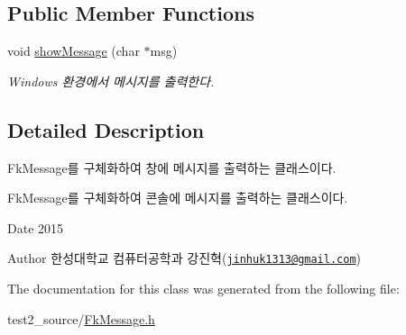 \subsection*{Public Member Functions}
\begin{DoxyCompactItemize}
\item 
\hypertarget{class_fk_windows_message_a13b6e901b6bfa83a09e9a099d40bf25c}{}void \hyperlink{class_fk_windows_message_a13b6e901b6bfa83a09e9a099d40bf25c}{show\+Message} (char $\ast$msg)\label{class_fk_windows_message_a13b6e901b6bfa83a09e9a099d40bf25c}

\begin{DoxyCompactList}\small\item\em Windows 환경에서 메시지를 출력한다. \end{DoxyCompactList}\end{DoxyCompactItemize}


\subsection{Detailed Description}
Fk\+Message를 구체화하여 창에 메시지를 출력하는 클래스이다. 

Fk\+Message를 구체화하여 콘솔에 메시지를 출력하는 클래스이다.

\begin{DoxyDate}{Date}
2015 
\end{DoxyDate}
\begin{DoxyAuthor}{Author}
한성대학교 컴퓨터공학과 강진혁(\href{mailto:jinhuk1313@gmail.com}{\tt jinhuk1313@gmail.\+com}) 
\end{DoxyAuthor}


The documentation for this class was generated from the following file\+:\begin{DoxyCompactItemize}
\item 
test2\+\_\+source/\hyperlink{_fk_message_8h}{Fk\+Message.\+h}\end{DoxyCompactItemize}
